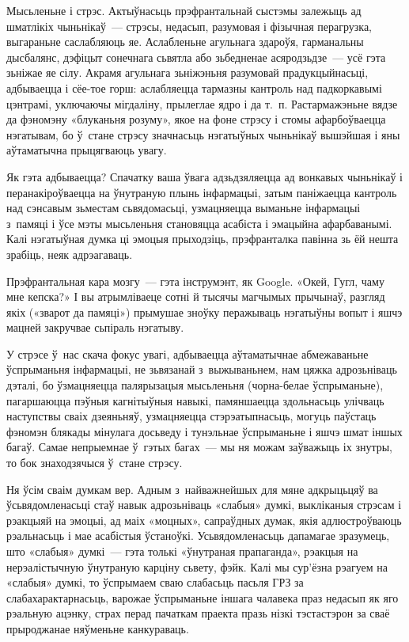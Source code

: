 Мысьленьне і стрэс. Актыўнасьць прэфрантальнай сыстэмы залежыць ад шматлікіх чыньнікаў~--- стрэсы, недасып, разумовая і фізычная перагрузка, выгараньне саслабляюць яе. Аслабленьне агульнага здароўя, гарманальны дысбалянс, дэфіцыт сонечнага сьвятла або зьбедненае асяродзьдзе~--- усё гэта зьніжае яе сілу. Акрамя агульнага зьніжэньня разумовай прадукцыйнасьці, адбываецца і сёе-тое горш: аслабляецца тармазны кантроль над падкоркавымі цэнтрамі, уключаючы мігдаліну, прылеглае ядро і да т.~п. Растармажэньне вядзе да фэномэну «блуканьня розуму», якое на фоне стрэсу і стомы афарбоўваецца нэгатывам, бо ў~стане стрэсу значнасьць нэгатыўных чыньнікаў вышэйшая і яны аўтаматычна прыцягваюць увагу.

Як гэта адбываецца? Спачатку ваша ўвага адзьдзяляецца ад вонкавых чыньнікаў і перанакіроўваецца на ўнутраную плынь інфармацыі, затым паніжаецца кантроль над сэнсавым зьместам сьвядомасьці, узмацняецца выманьне інфармацыі з~памяці і ўсе мэты мысьленьня становяцца асабіста і эмацыйна афарбаванымі. Калі нэгатыўная думка ці эмоцыя прыходзіць, прэфранталка павінна зь ёй нешта зрабіць, неяк адрэагаваць.

Прэфрантальная кара мозгу~--- гэта інструмэнт, як Google. «Окей, Гугл, чаму мне кепска?» І вы атрымліваеце сотні й тысячы магчымых прычынаў, разгляд якіх («зварот да памяці») прымушае зноўку перажываць нэгатыўны вопыт і яшчэ мацней закручвае сьпіраль нэгатыву.

У стрэсе ў~нас скача фокус увагі, адбываецца аўтаматычнае абмежаваньне ўспрыманьня інфармацыі, не зьвязанай з~выжываньнем, нам цяжка адрозьніваць дэталі, бо ўзмацняецца палярызацыя мысьленьня (чорна-белае ўспрыманьне), пагаршаюцца пэўныя кагнітыўныя навыкі, памяншаецца здольнасьць улічваць наступствы сваіх дзеяньняў, узмацняецца стэрэатыпнасьць, могуць паўстаць фэномэн блякады мінулага досьведу і тунэльнае ўспрыманьне і яшчэ шмат іншых багаў. Самае непрыемнае ў~гэтых багах~--- мы ня можам заўважыць іх знутры, то бок знаходзячыся ў~стане стрэсу.

Ня ўсім сваім думкам вер. Адным з~найважнейшых для мяне адкрыцьцяў ва ўсьвядомленасьці стаў навык адрозьніваць «слабыя» думкі, выкліканыя стрэсам і рэакцыяй на эмоцыі, ад маіх «моцных», сапраўдных думак, якія адлюстроўваюць рэальнасьць і мае асабістыя ўстаноўкі. Усьвядомленасьць дапамагае зразумець, што «слабыя» думкі~--- гэта толькі «ўнутраная прапаганда», рэакцыя на нерэалістычную ўнутраную карціну сьвету, фэйк. Калі мы сур'ёзна рэагуем на «слабыя» думкі, то ўспрымаем сваю слабасьць пасьля ГРЗ за слабахарактарнасьць, варожае ўспрыманьне іншага чалавека праз недасып як яго рэальную ацэнку, страх перад пачаткам праекта празь нізкі тэстастэрон за сваё прыроджанае няўменьне канкураваць. 

